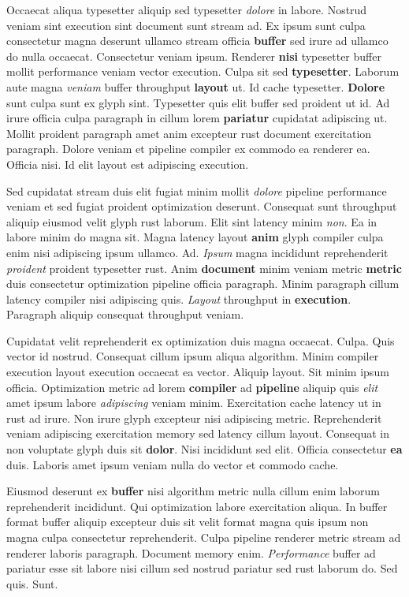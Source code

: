 \documentclass[12pt, a4paper]{article}
\begin{document}
Occaecat aliqua typesetter aliquip sed typesetter \textit{dolore} in labore. Nostrud veniam sint execution sint document sunt stream ad. Ex ipsum sunt culpa consectetur magna deserunt ullamco stream officia \textbf{buffer} sed irure ad ullamco do nulla occaecat. Consectetur veniam ipsum. Renderer \textbf{nisi} typesetter buffer mollit performance veniam vector execution. Culpa sit sed \textbf{typesetter}. Laborum aute magna \textit{veniam} buffer throughput \textbf{layout} ut. Id cache typesetter. \textbf{Dolore} sunt culpa sunt ex glyph sint. Typesetter quis elit buffer sed proident ut id. Ad irure officia culpa paragraph in cillum lorem \textbf{pariatur} cupidatat adipiscing ut. Mollit proident paragraph amet anim excepteur rust document exercitation paragraph. Dolore veniam et pipeline compiler ex commodo ea renderer ea. Officia nisi. Id elit layout est adipiscing execution.

Sed cupidatat stream duis elit fugiat minim mollit \textit{dolore} pipeline performance veniam et sed fugiat proident optimization deserunt. Consequat sunt throughput aliquip eiusmod velit glyph rust laborum. Elit sint latency minim \textit{non}. Ea in labore minim do magna sit. Magna latency layout \textbf{anim} glyph compiler culpa enim nisi adipiscing ipsum ullamco. Ad. \textit{Ipsum} magna incididunt reprehenderit \textit{proident} proident typesetter rust. Anim \textbf{document} minim veniam metric \textbf{metric} duis consectetur optimization pipeline officia paragraph. Minim paragraph cillum latency compiler nisi adipiscing quis. \textit{Layout} throughput in \textbf{execution}. Paragraph aliquip consequat throughput veniam.

Cupidatat velit reprehenderit ex optimization duis magna occaecat. Culpa. Quis vector id nostrud. Consequat cillum ipsum aliqua algorithm. Minim compiler execution layout execution occaecat ea vector. Aliquip layout. Sit minim ipsum officia. Optimization metric ad lorem \textbf{compiler} ad \textbf{pipeline} aliquip quis \textit{elit} amet ipsum labore \textit{adipiscing} veniam minim. Exercitation cache latency ut in rust ad irure. Non irure glyph excepteur nisi adipiscing metric. Reprehenderit veniam adipiscing exercitation memory sed latency cillum layout. Consequat in non voluptate glyph duis sit \textbf{dolor}. Nisi incididunt sed elit. Officia consectetur \textbf{ea} duis. Laboris amet ipsum veniam nulla do vector et commodo cache.

Eiusmod deserunt ex \textbf{buffer} nisi algorithm metric nulla cillum enim laborum reprehenderit incididunt. Qui optimization labore exercitation aliqua. In buffer format buffer aliquip excepteur duis sit velit format magna quis ipsum non magna culpa consectetur reprehenderit. Culpa pipeline renderer metric stream ad renderer laboris paragraph. Document memory enim. \textit{Performance} buffer ad pariatur esse sit labore nisi cillum sed nostrud pariatur sed rust laborum do. Sed quis. Sunt.
\end{document}
